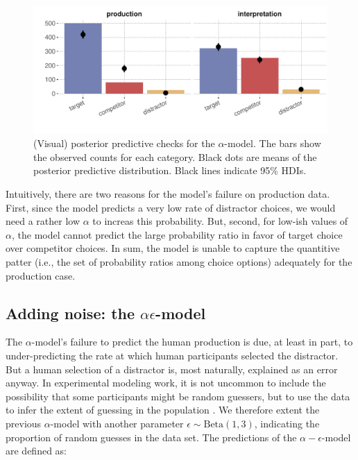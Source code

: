 \documentclass{article}
\begin{document}
\begin{figure}[t]
  \centering

  \includegraphics[width = 0.9 \textwidth]{00-pics/PPC-alpha-model.pdf}

  \caption{(Visual) posterior predictive checks for the $\alpha$-model.
    The bars show the observed counts for each category.
    Black dots are means of the posterior predictive distribution.
    Black lines indicate 95\% HDIs.
  }
  \label{fig:PPC-alpha-model}
\end{figure}


Intuitively, there are two reasons for the model's failure on production data.
First, since the model predicts a very low rate of distractor choices, we would need a rather low \(\alpha\) to increas this probability.
But, second, for low-ish values of \(\alpha\), the model cannot predict the large probability ratio in favor of target choice over competitor choices.
In sum, the model is unable to capture the quantitive patter (i.e., the set of probability ratios among choice options) adequately for the production case.


\subsection{Adding noise: the \(\alpha \epsilon\)-model}
\label{sec:adding-noise-the-alpha-epsilon-model}

The $\alpha$-model's  failure to predict the human production is due, at least in part, to under-predicting the rate at which human participants selected the distractor.
But a human selection of a distractor is, most naturally, explained as an error anyway.
In experimental modeling work, it is not uncommon to include the possibility that some participants might be random guessers, but to use the data to infer the extent of guessing in the population \citep{LeeWagenmakers2013:Bayesian-Cognit}.
We therefore extent the previous $\alpha$-model with another parameter \(\epsilon \sim \text{Beta}(1,3)\), indicating the proportion of random guesses in the data set.
The predictions of the $\alpha-\epsilon$-model are defined as:
\end{document}

